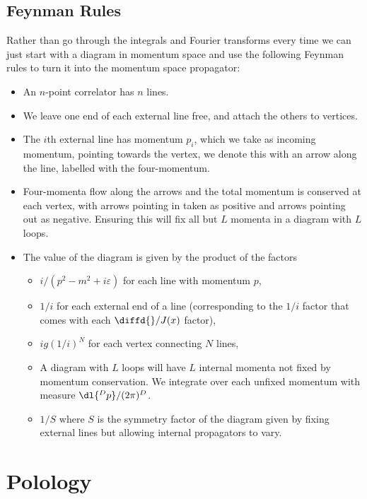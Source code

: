 \documentclass[fleqn]{NotesClass}
\begin{document}
    \section{Feynman Rules}\label{sec:feynman rules scalar correlator momentum space}
    Rather than go through the integrals and Fourier transforms every time we can just start with a diagram in momentum space and use the following Feynman rules to turn it into the momentum space propagator:
    \begin{itemize}
        \item An \(n\)-point correlator has \(n\) lines.
        \item We leave one end of each external line free, and attach the others to vertices.
        \item The \(i\)th external line has momentum \(p_i\), which we take as incoming momentum, pointing towards the vertex, we denote this with an arrow along the line, labelled with the four-momentum.
        \item Four-momenta flow along the arrows and the total momentum is conserved at each vertex, with arrows pointing in taken as positive and arrows pointing out as negative.
        Ensuring this will fix all but \(L\) momenta in a diagram with \(L\) loops.
        \item The value of the diagram is given by the product of the factors
        \begin{itemize}
            \item \(i/(p^2 - m^2 + i\varepsilon)\) for each line with momentum \(p\),
            \item \(1/i\) for each external end of a line (corresponding to the \(1/i\) factor that comes with each \(\diffd{}/{J(x)}\) factor),
            \item \(ig(1/i)^{N}\) for each vertex connecting \(N\) lines,
            \item A diagram with \(L\) loops will have \(L\) internal momenta not fixed by momentum conservation.
            We integrate over each unfixed momentum with measure \(\dl{^Dp}/(2\pi)^D\).
        \item \(1/S\) where \(S\) is the symmetry factor of the diagram given by fixing external lines but allowing internal propagators to vary.
        \end{itemize}
    \end{itemize}
    
    \chapter{Polology}
\end{document}
